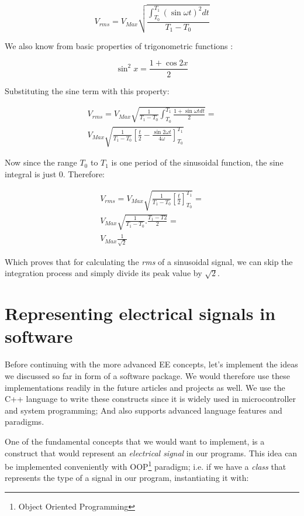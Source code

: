 \documentclass{article}
\begin{document}
	$$V_{rms} = V_{Max} \sqrt{\frac{\int_{T_0}^{T_1} (\sin \omega t) ^ 2 dt }{T_1 - T_0}}$$
	
	We also know from basic properties of trigonometric functions :
	
	$$ \sin^2 x = \frac{1 + \cos 2x}{2} $$
	
	Substituting the sine term with this property:
	
	\begin{align} 
	V_{rms} = V_{Max} \sqrt{\frac{1}{{T_1 - T_0}}{\int_{T_0}^{T_1} \frac{1 + \sin \omega t dt}{2}}} = \\
	 V_{Max} \sqrt{\frac{1}{T_1 - T_0} \left[ \frac{t}{2} - \frac{\sin 2 \omega t}{4 \omega}\right]_{T_0}^{T_1} }
	\end{align}
	
	Now since the range $T_0$ to $T_1$ is one period of the sinusoidal function, the sine integral is just $0$. Therefore:
		
	\begin{equation}
	\begin{gathered}
	V_{rms} = V_{Max} \sqrt{\frac{1}{T_1 - T_0} \left[ \frac{t}{2} \right]_{T_0}^{T_1}} = \\
	V_{Max}\sqrt{\frac{1}{T_1 - T_0} . \frac{T_1 - T2}{2}} = \\
 V_{Max} \frac{1}{\sqrt{2}}
	\end{gathered}
	\end{equation}

	Which proves that for calculating the \textit{rms} of a sinusoidal signal, we can skip the integration process and simply divide its peak value by $\sqrt{2}$.

	
	\section{Representing electrical signals in software}
	Before continuing with the more advanced EE concepts, let's implement the ideas we discussed so far in form of a software package. We would therefore use these implementations readily in the future articles and projects as well. We use the C++ language to write these constructs since it is widely used in microcontroller and system programming; And also supports advanced language features and paradigms.
	
	One of the fundamental concepts that we would want to implement, is a construct that would represent an \textit{electrical signal} in our programs. This idea can be implemented conveniently with OOP\footnote[1]{Object Oriented Programming} paradigm; i.e. if we have a \textit{class} that represents the type of a signal in our program, instantiating it with:
	
\end{document}
